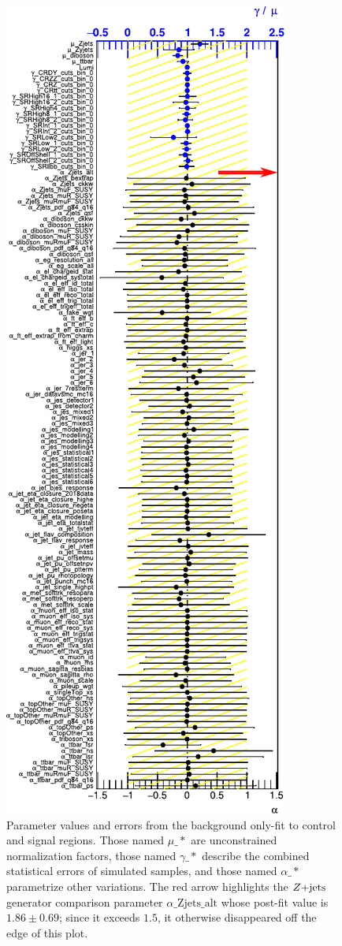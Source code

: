 \begin{figure}[tp]
\centering
\includegraphics[height=0.81\textheight]{figures/2ljets_fit_parameters.pdf}
\caption[
Parameter values and errors from the background only-fit to control and signal
regions
]{%
Parameter values and errors from the background only-fit to control and signal
regions.
Those named $\mu\_*$ are unconstrained normalization factors,
those named $\gamma\_*$ describe the combined statistical errors of simulated
samples,
and those named $\alpha\_*$ parametrize other variations.
The red arrow highlights the $Z\mathrm{+jets}$ generator comparison parameter
$\alpha\mathrm{\_Zjets\_alt}$ whose post-fit value is
$1.86 \pm 0.69$;
since it exceeds $1.5$, it otherwise disappeared off the edge of this plot.
}
\label{fig:2ljets_fit_parameters}
\end{figure}

